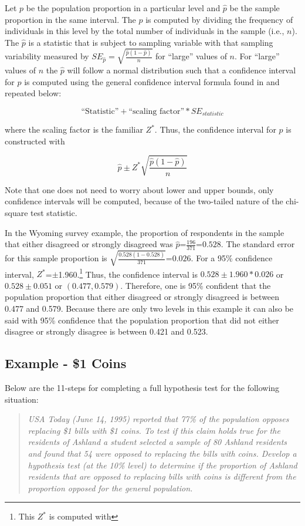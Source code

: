 \documentclass[10pt,openany]{book}\usepackage[]{graphicx}\usepackage[]{color}
\begin{document}
Let $p$ be the population proportion in a particular level and $\hat{p}$ be the sample proportion in the same interval. The $\hat{p}$ is computed by dividing the frequency of individuals in this level by the total number of individuals in the sample (i.e., $n$). The $\hat{p}$ is a statistic that is subject to sampling variable with that sampling variability measured by $SE_{\hat{p}}=\sqrt{\frac{\hat{p}(1-\hat{p})}{n}}$ for ``large'' values of $n$. For ``large'' values of $n$ the $\hat{p}$ will follow a normal distribution such that a confidence interval for $p$ is computed using the general confidence interval formula found in  and repeated below:

  \[ \text{``Statistic''} + \text{``scaling factor''} * SE_{statistic} \]

where the scaling factor is the familiar $Z^{*}$. Thus, the confidence interval for $p$ is constructed with

  \[ \hat{p} \pm Z^{*}\sqrt{\frac{\hat{p}(1-\hat{p})}{n}} \]

Note that one does not need to worry about lower and upper bounds, only confidence intervals will be computed, because of the two-tailed nature of the chi-square test statistic.

In the Wyoming survey example, the proportion of respondents in the sample that either disagreed or strongly disagreed was $\hat{p}$=$\frac{196}{371}$=$0.528$. The standard error for this sample proportion is $\sqrt{\frac{0.528(1-0.528)}{371}}$=$0.026$. For a 95\% confidence interval, $Z^{*}$=$\pm$1.960.\footnote{This $Z^{*}$ is computed with } Thus, the confidence interval is $0.528 \pm 1.960*0.026$ or $0.528 \pm 0.051$ or $(0.477,0.579)$. Therefore, one is 95\% confident that the population proportion that either disagreed or strongly disagreed is between 0.477 and 0.579. Because there are only two levels in this example it can also be said with 95\% confidence that the population proportion that did not either disagree or strongly disagree is between 0.421 and 0.523.

\subsection{Example - \$1 Coins}
Below are the 11-steps  for completing a full hypothesis test for the following situation:
\vspace{-4pt}
\begin{quote}
\textsl{USA Today (June 14, 1995) reported that 77\% of the population opposes replacing \$1 bills with \$1 coins. To test if this claim holds true for the residents of Ashland a student selected a sample of 80 Ashland residents and found that 54 were opposed to replacing the bills with coins. Develop a hypothesis test (at the 10\% level) to determine if the proportion of Ashland residents that are opposed to replacing bills with coins is different from the proportion opposed for the general population.}
\end{quote}
\end{document}
